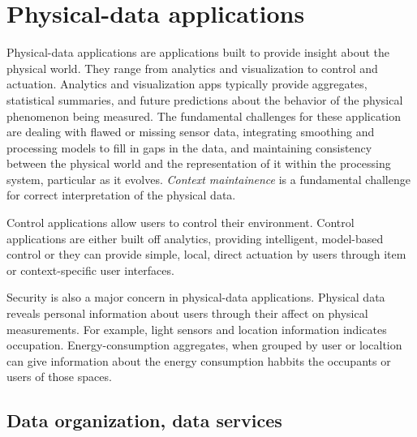 \documentclass[10pt,print,letterpaper]{sigplan-proc-varsize}
\begin{document}
% 




% 

%
%



\section{Physical-data applications}
Physical-data applications are applications built to provide insight about the physical world.  They range from
analytics and visualization to control and actuation.  Analytics and visualization apps typically 
provide aggregates, statistical summaries, and future predictions about the behavior of the physical phenomenon 
being measured.  The fundamental challenges for these application are dealing with flawed or missing sensor data,
integrating smoothing and processing models to fill in gaps in the data, and maintaining consistency
between the physical world and the representation of it within the processing system, particular as it evolves.  
\emph{Context maintainence} is a fundamental challenge for correct interpretation of the physical data.

Control applications allow users to control their environment.  Control applications are either built off
analytics, providing intelligent, model-based control or they can provide simple, local, direct actuation by users 
through item or context-specific user interfaces.

Security is also a major concern in physical-data applications.  Physical data reveals personal information
about users through their affect on physical measurements.  For example, light sensors and location information
indicates occupation.  Energy-consumption aggregates, when grouped by user or localtion can give information about
the energy consumption habbits the occupants or users of those spaces.

\subsection{Data organization, data services}
\end{document}
